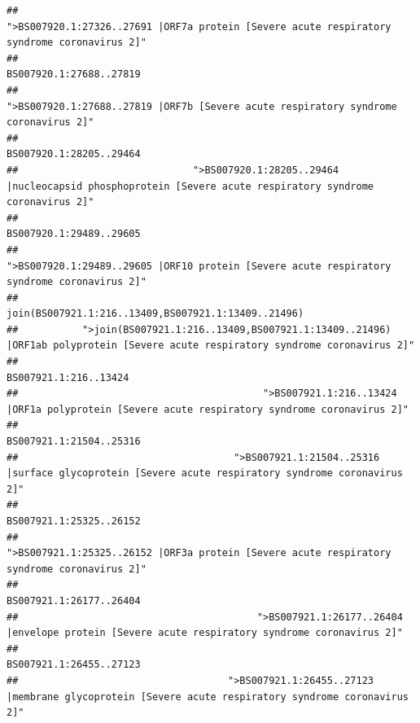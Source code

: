 \documentclass[
]{article}
\begin{document}
\begin{verbatim}
##                                            ">BS007920.1:27326..27691 |ORF7a protein [Severe acute respiratory syndrome coronavirus 2]" 
##                                                                                                                BS007920.1:27688..27819 
##                                                    ">BS007920.1:27688..27819 |ORF7b [Severe acute respiratory syndrome coronavirus 2]" 
##                                                                                                                BS007920.1:28205..29464 
##                              ">BS007920.1:28205..29464 |nucleocapsid phosphoprotein [Severe acute respiratory syndrome coronavirus 2]" 
##                                                                                                                BS007920.1:29489..29605 
##                                            ">BS007920.1:29489..29605 |ORF10 protein [Severe acute respiratory syndrome coronavirus 2]" 
##                                                                                    join(BS007921.1:216..13409,BS007921.1:13409..21496) 
##           ">join(BS007921.1:216..13409,BS007921.1:13409..21496) |ORF1ab polyprotein [Severe acute respiratory syndrome coronavirus 2]" 
##                                                                                                                  BS007921.1:216..13424 
##                                          ">BS007921.1:216..13424 |ORF1a polyprotein [Severe acute respiratory syndrome coronavirus 2]" 
##                                                                                                                BS007921.1:21504..25316 
##                                     ">BS007921.1:21504..25316 |surface glycoprotein [Severe acute respiratory syndrome coronavirus 2]" 
##                                                                                                                BS007921.1:25325..26152 
##                                            ">BS007921.1:25325..26152 |ORF3a protein [Severe acute respiratory syndrome coronavirus 2]" 
##                                                                                                                BS007921.1:26177..26404 
##                                         ">BS007921.1:26177..26404 |envelope protein [Severe acute respiratory syndrome coronavirus 2]" 
##                                                                                                                BS007921.1:26455..27123 
##                                    ">BS007921.1:26455..27123 |membrane glycoprotein [Severe acute respiratory syndrome coronavirus 2]" 

\end{verbatim}
\end{document}
